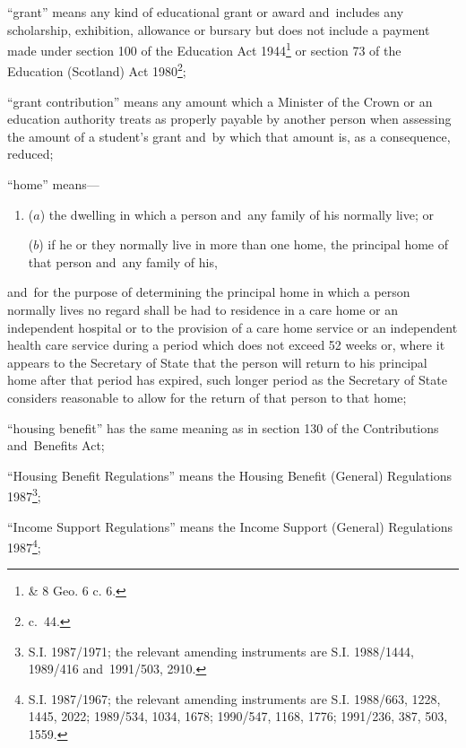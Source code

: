 \documentclass[12pt,a4paper]{article}
\begin{document}
\begin{enumerate}

“grant” means any kind of educational grant or award and~includes any scholarship, exhibition, allowance or bursary but does not include a payment made under section 100 of the Education Act 1944\footnote{ \& 8 Geo. 6 c. 6.} or section 73 of the Education (Scotland) Act 1980\footnote{ c.~44.};

“grant contribution” means any amount which a Minister of the Crown or an education authority treats as properly payable by another person when assessing the amount of a student’s grant and~by which that amount is, as a consequence, reduced;

“home” means—
\begin{enumerate}\item[]
($a$)
the dwelling in which a person and~any family of his normally live; or

($b$)
if he or they normally live in more than one home, the principal home of that person and~any family of his,
\end{enumerate}
and~for the purpose of determining the principal home in which a person normally lives no regard shall be had to residence in 
a care home or an independent hospital or to the provision of a care home service or an independent health care service  %
during a period which does not exceed 52 weeks or, where it appears to the 
Secretary of State  %
that the person will return to his principal home after that period has expired, such longer period as 
the Secretary of State  %
considers reasonable to allow for the return of that person to that home;

“housing benefit” has the same meaning as in section 130 of the Contributions and~Benefits Act;

“Housing Benefit Regulations” means the Housing Benefit (General) Regulations 1987\footnote{\frenchspacing S.I. 1987/1971; the relevant amending instruments are S.I. 1988/1444, 1989/416 and~1991/503, 2910.};

“Income Support Regulations” means the Income Support (General) Regulations 1987\footnote{\frenchspacing S.I. 1987/1967; the relevant amending instruments are S.I. 1988/663, 1228, 1445, 2022; 1989/534, 1034, 1678; 1990/547, 1168, 1776; 1991/236, 387, 503, 1559.};


\end{enumerate}
\end{document}
